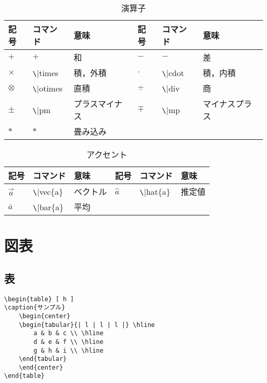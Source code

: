 \documentclass[11pt,a4paper]{jsarticle}
\begin{document}
\begin{table} [ h ]
\caption{演算子}
	\begin{center}
	\begin{tabular}{| l | l | l || l | l | l |} \hline
		記号 & コマンド & 意味 & 記号 & コマンド & 意味 \\ \hline
		$+$ & $+$ & 和 & $-$ & $-$ & 差 \\ \hline
		$\times$ & \verb|\|times & 積，外積 & $\cdot$ & \verb|\|cdot & 積，内積 \\ \hline
		$\otimes$ & \verb|\|otimes & 直積　& $\div$ & \verb|\|div & 商 \\ \hline
		$\pm$ & \verb|\|pm & プラスマイナス & $\mp$ & \verb|\|mp & マイナスプラス \\ \hline
		$*$ & $*$ & 畳み込み &  &  &  \\ \hline
	\end{tabular}
	\end{center}
\end{table}

\begin{table} [ h ]
\caption{アクセント}
	\begin{center}
	\begin{tabular}{| l | l | l || l | l | l |} \hline
		記号 & コマンド & 意味 & 記号 & コマンド & 意味 \\ \hline
		$\vec{a}$ & \verb|\|vec\{a\} & ベクトル & $\hat{a}$ & \verb|\|hat\{a\} & 推定値 \\ \hline
		$\bar{a}$ & \verb|\|bar\{a\} & 平均 &  &  &  \\ \hline
	\end{tabular}
	\end{center}
\end{table}


\section{図表}

\subsection{表}

\begin{lstlisting}
\begin{table} [ h ]
\caption{サンプル}
	\begin{center}
	\begin{tabular}{| l | l | l |} \hline
		a & b & c \\ \hline
		d & e & f \\ \hline
		g & h & i \\ \hline
	\end{tabular}
	\end{center}
\end{table}
\end{lstlisting}
\end{document}
